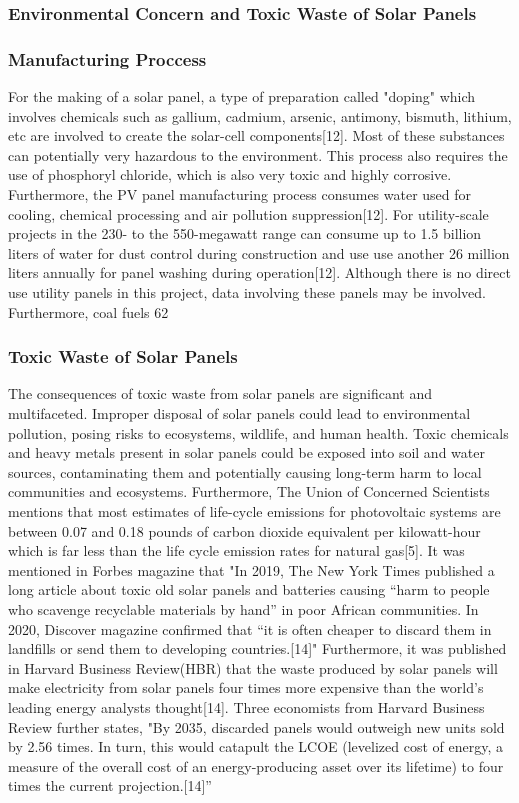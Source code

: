 \documentclass[10pt,twocolumn]{article}
\begin{document}
\subsubsection{Environmental Concern and Toxic Waste of Solar Panels }
\subsubsection{Manufacturing Proccess}
For the making of a solar panel, a type of preparation called "doping" which involves chemicals such as gallium, cadmium, arsenic, antimony, bismuth, lithium, etc are involved to create the solar-cell components[12]. Most of these substances can potentially very hazardous to the environment. This process also requires the use of phosphoryl chloride, which is also very toxic and highly corrosive. Furthermore, the PV panel manufacturing process consumes water used for cooling, chemical processing and air pollution suppression[12]. For utility-scale projects in the 230- to the 550-megawatt range can consume up to 1.5 billion liters of water for dust control during construction and use use another 26 million liters annually for panel washing during operation[12]. Although there is no direct use utility panels in this project, data involving these panels may be involved. Furthermore, coal fuels 62%
\subsubsection{Toxic Waste of Solar Panels}The consequences of toxic waste from solar panels are significant and multifaceted. Improper disposal of solar panels could lead to environmental pollution, posing risks to ecosystems, wildlife, and human health. Toxic chemicals and heavy metals present in solar panels could be exposed into soil and water sources, contaminating them and potentially causing long-term harm to local communities and ecosystems. Furthermore, The Union of Concerned Scientists mentions that most estimates of life-cycle emissions for photovoltaic systems are between 0.07 and 0.18 pounds of carbon dioxide equivalent per kilowatt-hour which is far less than the life cycle emission rates  for natural gas[5]. It was mentioned in Forbes magazine that "In 2019, The New York Times published a long article about toxic old solar panels and batteries causing “harm to people who scavenge recyclable materials by hand” in poor African communities. In 2020, Discover  magazine confirmed that “it is often cheaper to discard them in landfills or send them to developing countries.[14]"  Furthermore, it was published in Harvard Business Review(HBR) that the waste produced by solar panels will make electricity from solar panels four times more expensive than the world's leading energy analysts thought[14]. Three economists from Harvard Business Review further states, "By 2035, discarded panels would outweigh new units sold by 2.56 times. In turn, this would catapult the LCOE (levelized cost of energy, a measure of the overall cost of an energy-producing asset over its lifetime) to four times the current projection.[14]”  
\end{document}
